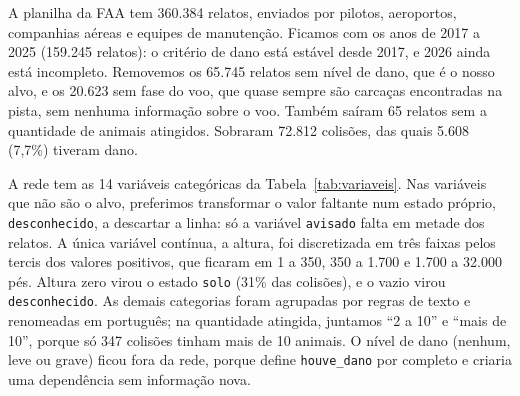 \documentclass[10pt,a4paper,twocolumn]{article}
\newcommand{\var}[1]{\texttt{#1}}
\begin{document}
A planilha da FAA tem 360.384 relatos, enviados por pilotos, aeroportos, companhias aéreas e equipes de manutenção.
Ficamos com os anos de 2017 a 2025 (159.245 relatos): o critério de dano está estável desde 2017, e 2026 ainda está
incompleto. Removemos os 65.745 relatos sem nível de dano, que é o nosso alvo, e os 20.623 sem fase do voo, que
quase sempre são carcaças encontradas na pista, sem nenhuma informação sobre o voo. Também saíram 65 relatos sem a
quantidade de animais atingidos. Sobraram 72.812 colisões, das quais 5.608 (7,7\%) tiveram dano.

A rede tem as 14 variáveis categóricas da Tabela~\ref{tab:variaveis}. Nas variáveis que não são o alvo, preferimos
transformar o valor faltante num estado próprio, \var{desconhecido}, a descartar a linha: só a variável \var{avisado}
falta em metade dos relatos. A única variável contínua, a altura, foi discretizada em três faixas pelos tercis dos
valores positivos, que ficaram em 1 a 350, 350 a 1.700 e 1.700 a 32.000 pés. Altura zero virou o estado \var{solo}
(31\% das colisões), e o vazio virou \var{desconhecido}. As demais categorias foram agrupadas por regras de texto e
renomeadas em português; na quantidade atingida, juntamos ``2 a 10'' e ``mais de 10'', porque só 347 colisões tinham
mais de 10 animais. O nível de dano (nenhum, leve ou grave) ficou fora da rede, porque define \var{houve\_dano} por
completo e criaria uma dependência sem informação nova.
\end{document}
